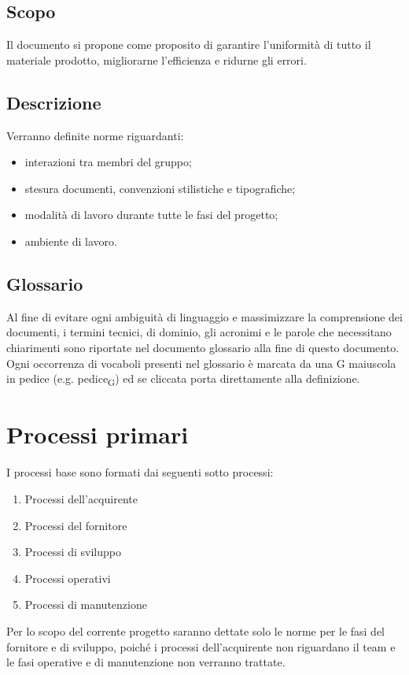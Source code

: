 \documentclass[12pt,a4paper]{article}
\begin{document}
\subsection{Scopo}
Il documento si propone come proposito di garantire l'uniformità di tutto il materiale prodotto, migliorarne l'efficienza e ridurne gli errori.

\subsection{Descrizione}
Verranno definite norme riguardanti:
\begin{itemize}
	\item interazioni tra membri del gruppo;
	\item stesura documenti, convenzioni stilistiche e tipografiche;
	\item modalità di lavoro durante tutte le fasi del progetto;
	\item ambiente di lavoro.
\end{itemize}

\subsection{Glossario}
Al fine di evitare ogni ambiguità di linguaggio e massimizzare la comprensione dei documenti, i termini tecnici, di dominio, gli acronimi e le parole che necessitano chiarimenti sono riportate nel documento glossario alla fine di questo documento. Ogni occorrenza di vocaboli presenti nel glossario è marcata da una G maiuscola in pedice (e.g. pedice\textsubscript{G}) ed se cliccata porta direttamente alla definizione.

\newpage

\section{Processi primari}
I processi base sono formati dai seguenti sotto processi:
\begin{enumerate}
\item Processi dell'acquirente
\item Processi del fornitore
\item Processi di sviluppo
\item Processi operativi
\item Processi di manutenzione
\end{enumerate}
Per lo scopo del corrente progetto saranno dettate solo le norme per le fasi del fornitore e di sviluppo, poiché i processi  dell'acquirente non riguardano il team e le fasi operative e di manutenzione non verranno trattate.
\end{document}
